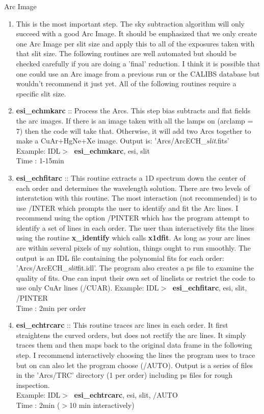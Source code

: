 \documentclass[11pt,letterpaper,dvips]{article}
\begin{document}
\begin{enumerate}
{\Large  \item Arc Image }
  \begin{enumerate}
	\item This is the most important step.  The sky subtraction
	algorithm will only succeed with a good Arc Image.  It should be 
	emphasized that we only create one Arc Image per slit size and apply
	this to all of the exposures taken with that slit size.  The following
	routines are well automated but should be checked carefully if you are
	doing a 'final' reduction.  I think it is possible that one could use
	an Arc image from a previous run or the CALIBS database 
	but wouldn't recommend it just
	yet.  All of the following routines require a specific slit size.

	\item {\bf esi\_echmkarc} :: Process the Arcs.  
	This step bias subtracts
	and flat fields the arc images.  If there is an image taken with all
	the lamps on (arclamp = 7) then the code will take that.  Otherwise,
	it will add two Arcs together to make a CuAr+HgNe+Xe image.  Output
	is: 'Arcs/ArcECH\_{\it slit}.fits' \\
         \quad Example: IDL$> \;$ {\bf esi\_echmkarc}, esi, slit \\
         \quad Time   : 1-15min

	\item {\bf esi\_echfitarc} :: This routine extracts a 1D spectrum down the
	center of each order and determines the wavelength solution.  
	There are two levels of interatction with this routine.  The most
	interaction (not recommended) is to use /INTER which prompts the
	user to identify and fit the Arc lines.  I recommend using the
	option /PINTER which has the program attempt to identify a set of
	lines in each order.  The user than interactively fits the lines
	using the routine {\bf x\_identify} which calls {\bf x1dfit}.
	As long as your arc lines are within several 
	pixels of my solution, things ought to run smoothly.
	The output is an IDL file containing the polynomial fits for each
	order: 'Arcs/ArcECH\_{\it slit}fit.idl'.  The program also creates
	a ps file to examine the quality of fits.   One can input their
	own set of linelists or restrict the code to use only CuAr lines
	(/CUAR).
         \quad Example: IDL$> \;$ {\bf esi\_echfitarc}, esi, slit, /PINTER \\
         \quad Time   : 2min per order

	\item {\bf esi\_echtrcarc} :: This routine traces arc lines in each
	order.  It first straightens the curved orders,  but does not rectify
	the arc lines.  It simply traces them and then maps back to the 
	original data frame in the following step.  I recommend interactively
	choosing the lines the program uses to trace but on can also let
	the program choose (/AUTO).  Output is a series of files in the
	'Arcs/TRC' directory (1 per order) including ps files for rough 
	inspection.  \\
         \quad Example: IDL$> \;$ {\bf esi\_echtrcarc}, esi, slit, /AUTO \\
         \quad Time   : 2min  ($>$10 min interactively)


\end{enumerate}
\end{enumerate}
\end{document}
